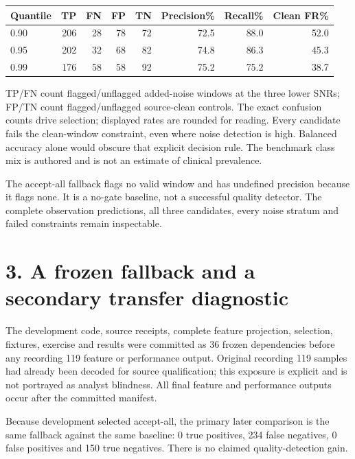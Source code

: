 \documentclass[10pt,letterpaper]{article}
\begin{document}
\begin{center}\small\begin{tabular}{@{}lrrrrrrr@{}}\toprule
Quantile & TP & FN & FP & TN & Precision\% & Recall\% & Clean FR\%\\\midrule
0.90 & 206 & 28 & 78 & 72 & 72.5 & 88.0 & 52.0 \\
0.95 & 202 & 32 & 68 & 82 & 74.8 & 86.3 & 45.3 \\
0.99 & 176 & 58 & 58 & 92 & 75.2 & 75.2 & 38.7 \\
\bottomrule\end{tabular}\end{center}

TP/FN count flagged/unflagged added-noise windows at the three lower SNRs; FP/TN count flagged/unflagged source-clean controls. The exact confusion counts drive selection; displayed rates are rounded for reading. Every candidate fails the clean-window constraint, even where noise detection is high. Balanced accuracy alone would obscure that explicit decision rule. The benchmark class mix is authored and is not an estimate of clinical prevalence.

The accept-all fallback flags no valid window and has undefined precision because it flags none. It is a no-gate baseline, not a successful quality detector. The complete observation predictions, all three candidates, every noise stratum and failed constraints remain inspectable.
\newpage
\section*{3. A frozen fallback and a secondary transfer diagnostic}
The development code, source receipts, complete feature projection, selection, fixtures, exercise and results were committed as 36 frozen dependencies before any recording 119 feature or performance output. Original recording 119 samples had already been decoded for source qualification; this exposure is explicit and is not portrayed as analyst blindness. All final feature and performance outputs occur after the committed manifest.

Because development selected accept-all, the primary later comparison is the same fallback against the same baseline: 0 true positives, 234 false negatives, 0 false positives and 150 true negatives. There is no claimed quality-detection gain.
\end{document}
